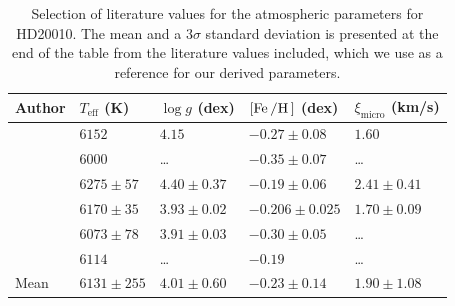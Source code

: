 \begin{table}[htb!]
    \caption{Selection of literature values for the atmospheric parameters for HD20010. The mean and
             a $3 \sigma$ standard deviation is presented at the end of the table from the
             literature values included, which we use as a reference for our derived parameters.}
    \label{tab:HD20010}
    \centering
    \begin{tabular}{l|llll}
      \hline\hline
     Author                 & $T_\mathrm{eff}$ (K) & $\log g$ (dex)  & $[\ion{Fe}/\ion{H}]$ (dex)  & $\xi_\mathrm{micro}$ (km/s)  \\
      \hline
    \cite{Balachandran1990} & $6152$               & $4.15$          & $-0.27 \pm0.08$             & $1.60$                       \\
    \cite{Favata1997}       & $6000$               & \ldots          & $-0.35 \pm0.07$             & \ldots                       \\
    \cite{Santos2004}       & $6275\pm57$          & $4.40\pm0.37$   & $-0.19 \pm0.06$             & $2.41\pm0.41$                \\
    \cite{Gonzalez2010}     & $6170\pm35$          & $3.93\pm0.02$   & $-0.206\pm0.025$            & $1.70\pm0.09$                \\
    \cite{Ramirez2012}      & $6073\pm78$          & $3.91\pm0.03$   & $-0.30 \pm0.05$             & \ldots                       \\
    \cite{Mortier2013}      & $6114$               & \ldots          & $-0.19$                     & \ldots                       \\
      \hline
      Mean                  & $6131\pm255$         & $4.01\pm0.60$   & $-0.23 \pm0.14$             & $1.90\pm1.08$                \\
      \hline
    \end{tabular}
\end{table}

